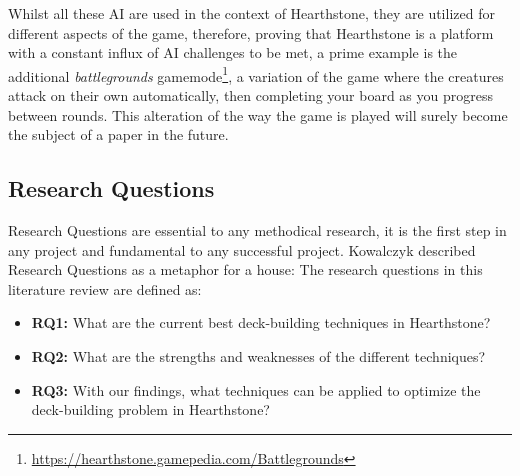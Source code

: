 \documentclass{report} %
\begin{document}
	Whilst all these AI are used in the context of Hearthstone, they are utilized for different aspects of the game, therefore, proving that Hearthstone is a platform with a constant influx of AI challenges to be met, a prime example is  the additional {\it{battlegrounds}} gamemode\footnote{\url{https://hearthstone.gamepedia.com/Battlegrounds}}, a variation of the game where the creatures attack on their own automatically, then completing your board as you progress between rounds. This alteration of the way the game is played will surely become the subject of a paper in the future. 

\subsection{Research Questions}
Research Questions are essential to any methodical research, it is the first step in any project and fundamental to any successful project. Kowalczyk\cite{Kowalczyk2013} described Research Questions as a metaphor for a house: 
The research questions in this literature review are defined as:

\begin{itemize}
\item \textbf{RQ1:} What are the current best deck-building techniques in Hearthstone?
\item \textbf{RQ2:} What are the strengths and weaknesses of the different techniques?
\item \textbf{RQ3:} With our findings, what techniques can be applied to optimize the deck-building problem in Hearthstone?
\end{itemize}
\end{document}
